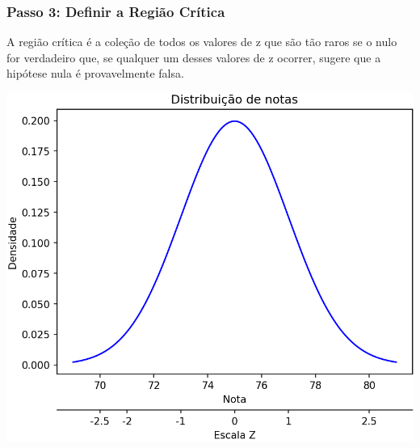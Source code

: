 \documentclass[11pt]{beamer}
\begin{document}
\begin{frame}
\frametitle{Passo 3: Definir a Região Crítica}
A região crítica é a coleção de todos os valores de z que são tão raros se o nulo for verdadeiro que, se qualquer um desses valores de z ocorrer, sugere que a hipótese nula é provavelmente falsa.
\begin{center}\includegraphics[width=0.6\linewidth]{figs/two_xticks_under} \end{center}

\end{frame}
\end{document}
